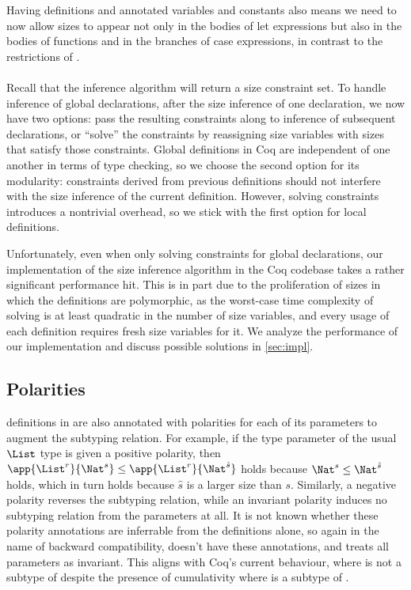 Having definitions and annotated variables and constants also means we need to now allow sizes to appear
not only in the bodies of let expressions but also in the bodies of functions and in the branches of case expressions,
in contrast to the restrictions of \CIChatminus.

\paragraph*{} Recall that the inference algorithm will return a size constraint set.
To handle inference of global declarations, after the size inference of one declaration,
we now have two options:
pass the resulting constraints along to inference of subsequent declarations,
or ``solve'' the constraints by reassigning size variables with sizes that satisfy those constraints.
Global definitions in Coq are independent of one another in terms of type checking,
so we choose the second option for its modularity:
constraints derived from previous definitions should not interfere with the size inference of the current definition.
However, solving constraints introduces a nontrivial overhead,
so we stick with the first option for local definitions.

Unfortunately, even when only solving constraints for global declarations,
our implementation of the size inference algorithm in the Coq codebase takes a rather significant performance hit.
This is in part due to the proliferation of sizes in which the definitions are polymorphic,
as the worst-case time complexity of solving is at least quadratic in the number of size variables,
and every usage of each definition requires fresh size variables for it.
We analyze the performance of our implementation and discuss possible solutions in \autoref{sec:impl}.

\subsection{Polarities}

\Coinductive definitions in \CIChatminus are also annotated with polarities for each of its parameters to augment the subtyping relation.
For example, if the type parameter of the usual $\List$ type is given a positive polarity,
then $\app{\List^r}{\Nat^s} \leq \app{\List^r}{\Nat^{\hat{s}}}$ holds
because $\Nat^s \leq \Nat^{\hat{s}}$ holds,
which in turn holds because $\hat{s}$ is a larger size than $s$.
Similarly, a negative polarity reverses the subtyping relation,
while an invariant polarity induces no subtyping relation from the parameters at all.
It is not known whether these polarity annotations are inferrable from the \coinductive definitions alone,
so again in the name of backward compatibility, \lang doesn't have these annotations,
and treats all parameters as invariant.
This aligns with Coq's current behaviour, where  is not a subtype of 
despite the presence of cumulativity where  is a subtype of .

